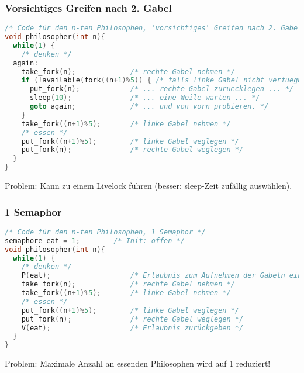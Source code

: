 \subsubsection*{Vorsichtiges Greifen nach 2. Gabel}
\begin{lstlisting}[language=C]
/* Code für den n-ten Philosophen, 'vorsichtiges' Greifen nach 2. Gabel */
void philosopher(int n){
  while(1) {
    /* denken */
  again:
    take_fork(n);             /* rechte Gabel nehmen */
    if (!available(fork((n+1)%5)) { /* falls linke Gabel nicht verfuegbar ... */
      put_fork(n);            /* ... rechte Gabel zuruecklegen ... */ 
      sleep(10);              /* ... eine Weile warten ... */ 
      goto again;             /* ... und von vorn probieren. */
    }
    take_fork((n+1)%5);       /* linke Gabel nehmen */
    /* essen */
    put_fork((n+1)%5);        /* linke Gabel weglegen */
    put_fork(n);              /* rechte Gabel weglegen */
  }
}
\end{lstlisting}
Problem: Kann zu einem Livelock führen (besser: sleep-Zeit zufällig auswählen).

\subsubsection*{1 Semaphor}
\begin{lstlisting}[language=C]
/* Code für den n-ten Philosophen, 1 Semaphor */
semaphore eat = 1;        /* Init: offen */
void philosopher(int n){
  while(1) {
    /* denken */
    P(eat);                   /* Erlaubnis zum Aufnehmen der Gabeln einholen */
    take_fork(n);             /* rechte Gabel nehmen */
    take_fork((n+1)%5);       /* linke Gabel nehmen */
    /* essen */
    put_fork((n+1)%5);        /* linke Gabel weglegen */
    put_fork(n);              /* rechte Gabel weglegen */
    V(eat);                   /* Erlaubnis zurückgeben */
  }
}

\end{lstlisting}
Problem: Maximale Anzahl an essenden Philosophen wird auf 1 reduziert!

